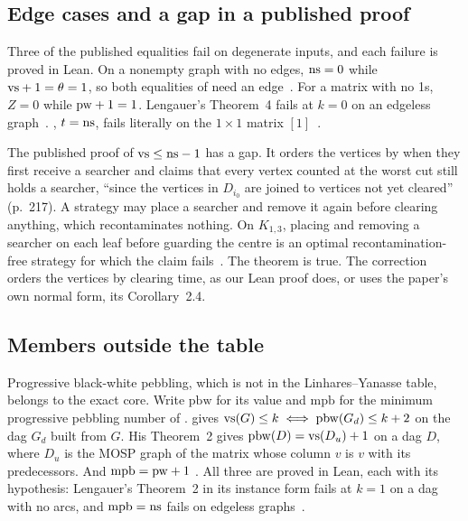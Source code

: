 \subsection{Edge cases and a gap in a published proof}
\label{app:edge}

Three of the published equalities fail on degenerate inputs, and each failure
is proved in Lean. On a nonempty graph with no edges, $\mathrm{ns}=0$ while
$\mathrm{vs}+1=\theta=1$, so both equalities of \citet{LY2002ref9,LY2002ref10} need an
edge~.
For a matrix with no 1s, $Z=0$ while $\mathrm{pw}+1=1$. Lengauer's Theorem~4 fails at
$k=0$ on an edgeless graph~.
\citet[Thm~3.9]{LY2002ref6}, $t=\mathrm{ns}$, fails literally on the $1\times1$ matrix
$[1]$~.

The published proof of $\mathrm{vs}\le\mathrm{ns}-1$ \citep[Thm~4.1]{LY2002ref10} has a gap. It
orders the vertices by when they first receive a searcher and claims that every
vertex counted at the worst cut still holds a searcher, ``since the vertices in
$D_{i_0}$ are joined to vertices not yet cleared'' (p.~217). A strategy may place
a searcher and remove it again before clearing anything, which recontaminates
nothing. On $K_{1,3}$, placing and removing a searcher on each leaf before
guarding the centre is an optimal recontamination-free strategy for which the
claim fails~. The theorem is true. The correction orders the vertices by clearing time, as our Lean proof does, or uses the
paper's own normal form, its Corollary~2.4.

\subsection{Members outside the table}
\label{app:thirteenth}

Progressive black-white pebbling, which is not in the Linhares--Yanasse
table, belongs to the exact core. Write $\mathrm{pbw}$ for its value and
$\mathrm{mpb}$ for the minimum progressive pebbling number of
\citet{LY2002ref10}. \citet[Thm~3]{LY2002ref14} gives
$\mathrm{vs}(G)\le k\iff\mathrm{pbw}(G_d)\le k+2$ on the dag $G_d$ built from $G$. His
Theorem~2 gives $\mathrm{pbw}(D)=\mathrm{vs}(D_u)+1$ on a dag $D$, where $D_u$ is the
MOSP graph of the matrix whose column $v$ is $v$ with its predecessors. And
$\mathrm{mpb}=\mathrm{pw}+1$ \citep[Thm~3.1]{LY2002ref10}. All three are proved in Lean, each with its hypothesis: Lengauer's
Theorem~2 in its instance form fails at $k=1$ on a dag with no arcs, and
$\mathrm{mpb}=\mathrm{ns}$ fails on edgeless graphs~.

